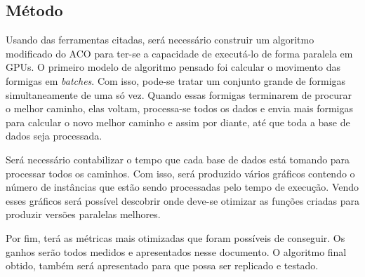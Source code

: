 \subsection{Método} \label{Metodo}

Usando das ferramentas citadas, será necessário construir um algoritmo modificado
do ACO para ter-se a capacidade de executá-lo de forma paralela em GPUs.
O primeiro modelo de algoritmo pensado foi calcular o movimento das formigas em \emph{batches}.
Com isso, pode-se tratar um conjunto grande de formigas simultaneamente de uma só vez.
Quando essas formigas terminarem de procurar o melhor caminho, elas voltam, processa-se todos os
dados e envia mais formigas para calcular o novo melhor caminho e assim por diante, até que toda
a base de dados seja processada.

Será necessário contabilizar o tempo que cada base de dados está tomando para processar todos os
caminhos. Com isso, será produzido vários gráficos contendo o número de instâncias que estão sendo
processadas pelo tempo de execução. Vendo esses gráficos será possível descobrir onde deve-se otimizar
as funções criadas para produzir versões paralelas melhores.

Por fim, terá as métricas mais otimizadas que foram possíveis de conseguir. Os ganhos serão todos
medidos e apresentados nesse documento. O algoritmo final obtido, também será apresentado para que
possa ser replicado e testado.

